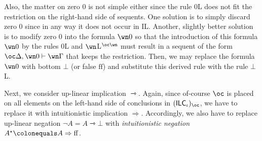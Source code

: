 \documentclass[a4paper]{article}
\theoremstyle{definition}
\theoremstyle{theorem}
\theoremstyle{remark}
\begin{document}
Also, the matter on zero $0$ is not simple either since the rule $0$L does not fit the restriction on the right-hand side of sequents.
One solution is to simply discard zero $0$ since in any way it does not occur in IL.
Another, slightly better solution is to modify zero $0$ into the formula $\wn 0$ so that the introduction of this formula $\wn 0$ by the rules $0$L and $\wn$L$^{\oc \wn}$ must result in a sequent of the form $\oc \Delta, \wn 0 \vdash \wn \Gamma$ that keeps the restriction.
Then, we may replace the formula $\wn 0$ with bottom $\bot$ (or false $\mathrm{ff}$) and substitute this derived rule with the rule $\bot$L.
\fi

Next, we consider up-linear implication $\rightarrowtriangle$.
Again, since of-course $\oc$ is placed on all elements on the left-hand side of conclusions in $(\textsf{ILC$_\iota$})_\oc$, we have to replace it with intuitionistic implication $\Rightarrow$.
Accordingly, we also have to replace up-linear negation $\neg A = A \rightarrowtriangle \bot$ with \emph{intuitionistic negation} $A^\star \colonequals A \Rightarrow \mathrm{ff}$.
\end{document}
